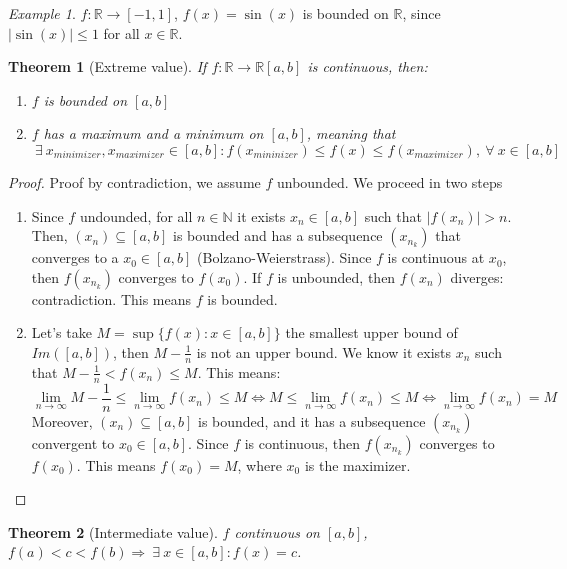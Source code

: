 \documentclass{article}
\newcommand{\abs}[1]{\left|#1\right|}
\newcommand{\Ar}{\Rightarrow}
\newenvironment{enumarabic}{\begin{enumerate}[label=(\arabic*)]}{\end{enumerate}}
\newenvironment{enumrom}{\begin{enumerate}[label=(\roman*)]}{\end{enumerate}}
\newcommand{\fr}[2]{\frac{#1}{#2}}
\newcommand{\f}[3]{#1 : #2 \rightarrow #3}
\newcommand{\fOnR}[1]{#1 : \mathbb{R} \rightarrow \mathbb{R}}
\newcommand{\intcc}[1]{\left[#1\right]}
\newcommand{\limn}{\lim_{n \to \infty}}
\theoremstyle{definition}
\theoremstyle{definition}
\theoremstyle{plain}
\newtheorem{theorem}{Theorem}[section]
\theoremstyle{plain}
\theoremstyle{plain}
\theoremstyle{plain}
\theoremstyle{definition}
\theoremstyle{remark}
\newtheorem{exampled}{Example}[definition]
\theoremstyle{remark}
\theoremstyle{remark}
\theoremstyle{remark}
\newcommand{\N}{\mathbb{N}}
\newcommand{\R}{\mathbb{R}}
\newcommand{\ForAll}{\ \forall \ }
\newcommand{\Exists}{\ \exists \ }
\begin{document}
\begin{exampled}
  $\f{f}{\R}{\intcc{-1,1}}$, $f(x) = \sin(x)$ is bounded on $\R$, since $\abs{\sin(x)} \leq 1$ for all $x \in \R$.
\end{exampled}


\begin{theorem}[Extreme value]
  If $\fOnR{f}{\intcc{a,b}}$ is continuous, then:
  \begin{enumrom}
    \item $f$ is bounded on $\intcc{a,b}$
    \item $f$ has a maximum and a minimum on $\intcc{a,b}$, meaning that
      \[
      \Exists x_{minimizer}, x_{maximizer} \in \intcc{a,b} :
      f(x_{mininizer}) \leq f(x) \leq f(x_{maximizer}), \ForAll x \in \intcc{a,b}
      \]
  \end{enumrom}
\end{theorem}

\begin{proof}
  Proof by contradiction, we assume $f$ unbounded. We proceed in two steps
  \begin{enumarabic}
    \item Since $f$ undounded, for all $n \in \N$ it exists $x_n \in \intcc{a,b}$ such that $\abs{f(x_n)} > n$. Then, $(x_n) \subseteq \intcc{a,b}$ is bounded and has a subsequence $(x_{n_k})$ that converges to a $x_0 \in \intcc{a,b}$ (Bolzano-Weierstrass). Since $f$ is continuous at $x_0$, then $f(x_{n_k})$ converges to $f(x_0)$. If $f$ is unbounded, then $f(x_n)$ diverges: contradiction. This means $f$ is bounded.
    \item Let's take $M = \sup\{ f(x) : x \in \intcc{a,b} \}$ the smallest upper
    bound of $Im(\intcc{a,b})$, then $M - \frac{1}{n}$ is not an upper bound.
    We know it exists $x_n$ such that $M - \frac{1}{n} < f(x_n) \leq M$. This
    means:
    \[
    \limn{M - \fr{1}{n}} \leq \limn{f(x_n)} \leq M \iff
    M \leq \limn{f(x_n)} \leq M \iff \limn{f(x_n)} = M
    \]
    Moreover, $(x_n) \subseteq \intcc{a,b}$ is bounded, and it has a subsequence $(x_{n_k})$ convergent to $x_0 \in \intcc{a,b}$. Since $f$ is continuous, then $f(x_{n_k})$ converges to $f(x_0)$. This means $f(x_0) = M$, where $x_0$ is the maximizer.
  \end{enumarabic}
\end{proof}


\begin{theorem}[Intermediate value]
  $f$ continuous on $\intcc{a,b}$, $f(a) < c < f(b) \Ar \Exists x \in \intcc{a,b} : f(x) = c$.
\end{theorem}
\end{document}

